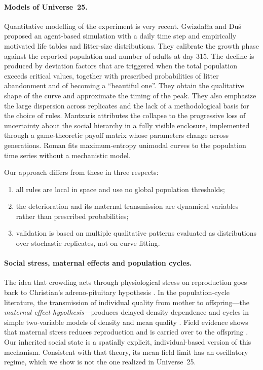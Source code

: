 \paragraph{Models of Universe~25.}
Quantitative modelling of the experiment is very recent.
Gwizdałła and Duś \cite{GwizdallaDus2026} proposed an agent-based simulation with a daily time step and
empirically motivated life tables and litter-size distributions.
They calibrate the growth phase against the reported population and number of adults at day 315.
The decline is produced by deviation factors that are triggered when the total population exceeds critical values,
together with prescribed probabilities of litter abandonment and of becoming a ``beautiful one''.
They obtain the qualitative shape of the curve and approximate the timing of the peak.
They also emphasize the large dispersion across replicates and the lack of a methodological basis for the choice of
rules.
Mantzaris \cite{Mantzaris2025} attributes the collapse to the progressive loss of uncertainty about the social
hierarchy in a fully visible enclosure, implemented through a game-theoretic payoff matrix whose parameters change
across generations.
Roman \cite{Roman2025} fits maximum-entropy unimodal curves to the population time series without a mechanistic model.

Our approach differs from these in three respects:
\begin{enumerate}
\item all rules are local in space and use no global population thresholds;
\item the deterioration and its maternal transmission are dynamical variables rather than prescribed
  probabilities;
\item validation is based on multiple qualitative patterns evaluated as distributions over stochastic replicates,
  not on curve fitting.
\end{enumerate}

\paragraph{Social stress, maternal effects and population cycles.}
The idea that crowding acts through physiological stress on reproduction goes back to Christian's
adreno-pituitary hypothesis \cite{Christian1950}.
In the population-cycle literature, the transmission of individual quality from mother to offspring---the
\emph{maternal effect hypothesis}---produces delayed density dependence and cycles in simple two-variable models of
density and mean quality \cite{GinzburgTaneyhill1994,InchaustiGinzburg1998}.
Field evidence shows that maternal stress reduces reproduction and is carried over to the offspring
\cite{Sheriff2009}.
Our inherited social state is a spatially explicit, individual-based version of this mechanism.
Consistent with that theory, its mean-field limit has an oscillatory regime, which we show is not the one realized
in Universe~25.

